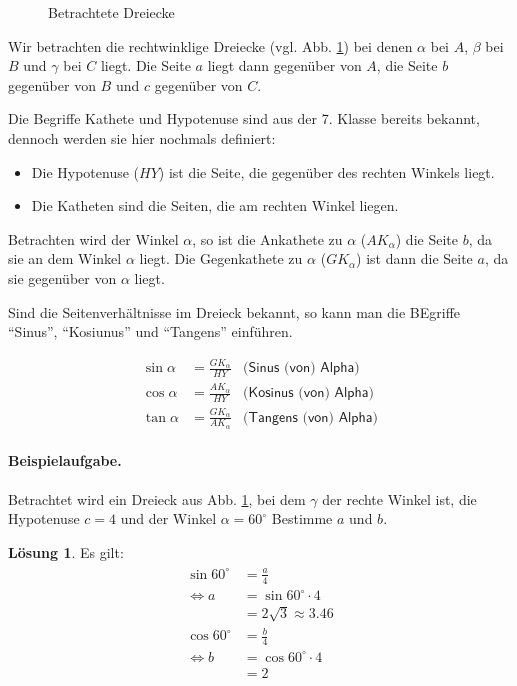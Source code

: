 \documentclass{report}
\newcommand{\x}{\cdot}
\theoremstyle{definition}
\theoremstyle{definition}
\newtheorem{losung}{Lösung}[section]
\theoremstyle{an}
\theoremstyle{lem}
\theoremstyle{def}
\theoremstyle{def}
\begin{document}
\begin{figure}[h]
    \centering
    
    \caption{Betrachtete Dreiecke}
    \label{fig:fig61}
\end{figure}

Wir betrachten die rechtwinklige Dreiecke (vgl. Abb. \ref{fig:fig61}) bei denen $\alpha$ bei $A$, $\beta$ bei $B$ und $\gamma$ bei $C$ liegt. Die Seite $a$ liegt dann gegenüber von $A$, die Seite $b$ gegenüber von $B$ und $c$ gegenüber von $C$.

Die Begriffe Kathete und Hypotenuse sind aus der 7. Klasse bereits bekannt, dennoch werden sie hier nochmals definiert:
\begin{itemize}
    \item Die Hypotenuse ($HY$) ist die Seite, die gegenüber des rechten Winkels liegt.
    \item Die Katheten sind die Seiten, die am rechten Winkel liegen.
\end{itemize}

\begin{defi}
Betrachten wird der Winkel $\alpha$, so ist die Ankathete zu $\alpha$ ($AK_\alpha$) die Seite $b$, da sie an dem Winkel $\alpha$ liegt. Die Gegenkathete zu $\alpha$ ($GK_\alpha$) ist dann die Seite $a$, da sie gegenüber von $\alpha$ liegt.
\end{defi}

Sind die Seitenverhältnisse im Dreieck bekannt, so kann man die BEgriffe ``Sinus'', ``Kosiunus'' und ``Tangens'' einführen.

\begin{defi}
    \begin{align}
    \sin \alpha &= \frac{GK_\alpha}{HY} & \textsf{(Sinus (von) Alpha)} \\
    \cos \alpha &= \frac{AK_\alpha}{HY} & \textsf{(Kosinus (von) Alpha)} \\
    \tan \alpha &= \frac{GK_\alpha}{AK_\alpha} & \textsf{(Tangens (von) Alpha)}
    \end{align}
\end{defi}
\pagebreak
\paragraph{\textsf{Beispielaufgabe.}} Betrachtet wird ein Dreieck aus Abb. \ref{fig:fig61}, bei dem $\gamma$ der rechte Winkel ist, die Hypotenuse $c = 4$ und der Winkel $\alpha=60^\circ$ Bestimme $a$ und $b$.
\begin{losung}
Es gilt:
\begin{align}
    \begin{aligned}
    \sin 60^\circ &= \frac{a}{4} \\
    \Leftrightarrow a &= \sin 60^\circ \x 4 \\
    &= 2\sqrt{3}\approx 3.46\\
    \cos 60^\circ &= \frac{b}{4} \\
    \Leftrightarrow b &= \cos 60^\circ \x 4 \\
    &= 2
    \end{aligned}
\end{align}
\end{losung}
\end{document}
